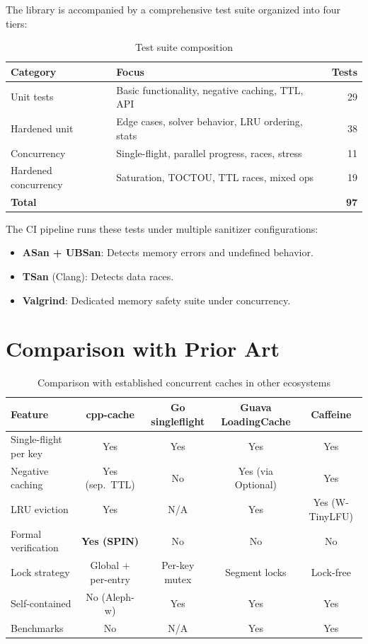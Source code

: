 \documentclass[11pt,a4paper]{article}
\begin{document}
The library is accompanied by a comprehensive test suite organized into
four tiers:

\begin{table}[htbp]
\centering
\begin{tabular}{@{}llr@{}}
\toprule
Category & Focus & Tests \\
\midrule
Unit tests & Basic functionality, negative caching, TTL, API & 29 \\
Hardened unit & Edge cases, solver behavior, LRU ordering, stats & 38 \\
Concurrency & Single-flight, parallel progress, races, stress & 11 \\
Hardened concurrency & Saturation, TOCTOU, TTL races, mixed ops & 19 \\
\midrule
\textbf{Total} & & \textbf{97} \\
\bottomrule
\end{tabular}
\caption{Test suite composition}
\end{table}

The CI pipeline runs these tests under multiple sanitizer configurations:

\begin{itemize}
\item \textbf{ASan + UBSan}: Detects memory errors and undefined behavior.
\item \textbf{TSan} (Clang): Detects data races.
\item \textbf{Valgrind}: Dedicated memory safety suite under concurrency.
\end{itemize}

\section{Comparison with Prior Art}
\label{sec:comparison}

\begin{table}[htbp]
\centering
\begin{tabular}{@{}lcccc@{}}
\toprule
Feature & cpp-cache & Go singleflight & Guava LoadingCache & Caffeine \\
\midrule
Single-flight per key & Yes & Yes & Yes & Yes \\
Negative caching & Yes (sep.\ TTL) & No & Yes (via Optional) & Yes \\
LRU eviction & Yes & N/A & Yes & Yes (W-TinyLFU) \\
Formal verification & \textbf{Yes (SPIN)} & No & No & No \\
Lock strategy & Global + per-entry & Per-key mutex & Segment locks & Lock-free \\
Self-contained & No (Aleph-w) & Yes & Yes & Yes \\
Benchmarks & No & N/A & Yes & Yes \\
\bottomrule
\end{tabular}
\caption{Comparison with established concurrent caches in other ecosystems}
\label{tab:comparison}
\end{table}
\end{document}
